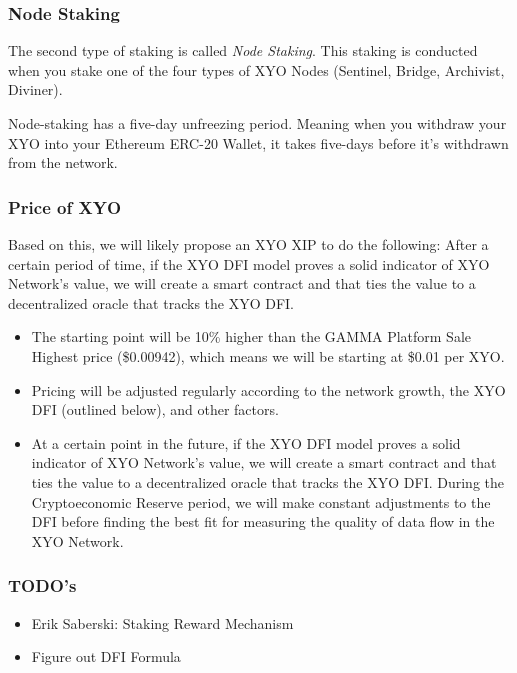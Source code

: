 \documentclass{article}
\begin{document}
\subsubsection{Node Staking}

The second type of staking is called \textit{Node Staking}. This staking is conducted when you stake one of the four types of XYO Nodes (Sentinel, Bridge, Archivist, Diviner). 

Node-staking has a five-day unfreezing period. Meaning when you withdraw your XYO into your Ethereum ERC-20 Wallet, it takes five-days before it’s withdrawn from the network.

\subsubsection{Price of XYO}

Based on this, we will likely propose an XYO XIP to do the following:
After a certain period of time, if the XYO DFI model proves a solid indicator of XYO Network’s value, we will create a smart contract and that ties the value to a decentralized oracle that tracks the XYO DFI.

\begin{itemize}
  \item The starting point will be 10\% higher than the GAMMA Platform Sale Highest price (\$0.00942), which means we will be starting at \$0.01 per XYO.
  \item Pricing will be adjusted regularly according to the network growth, the XYO DFI (outlined below), and other factors.
  \item At a certain point in the future, if the XYO DFI model proves a solid indicator of XYO Network’s value, we will create a smart contract and that ties the value to a decentralized oracle that tracks the XYO DFI. During the Cryptoeconomic Reserve period, we will make constant adjustments to the DFI before finding the best fit for measuring the quality of data flow in the XYO Network.
\end{itemize}

\subsubsection{TODO's}

\begin{itemize}
  \item Erik Saberski: Staking Reward Mechanism
  \item Figure out DFI Formula
\end{itemize}
\end{document}
